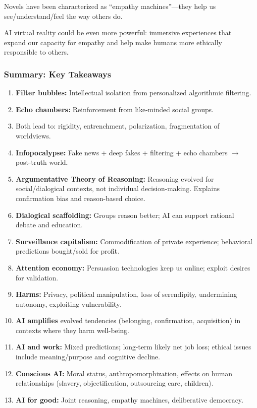 \begin{tipbox}
Novels have been characterized as ``empathy machines''---they help us see/understand/feel the way others do.

AI virtual reality could be even more powerful: immersive experiences that expand our capacity for empathy and help make humans more ethically responsible to others.
\end{tipbox}

\bigseparator

\subsubsection{Summary: Key Takeaways}

\begin{keybox}
\begin{enumerate}
  \item \textbf{Filter bubbles:} Intellectual isolation from personalized algorithmic filtering.
  \item \textbf{Echo chambers:} Reinforcement from like-minded social groups.
  \item Both lead to: rigidity, entrenchment, polarization, fragmentation of worldviews.
  \item \textbf{Infopocalypse:} Fake news + deep fakes + filtering + echo chambers $\to$ post-truth world.
  \item \textbf{Argumentative Theory of Reasoning:} Reasoning evolved for social/dialogical contexts, not individual decision-making. Explains confirmation bias and reason-based choice.
  \item \textbf{Dialogical scaffolding:} Groups reason better; AI can support rational debate and education.
  \item \textbf{Surveillance capitalism:} Commodification of private experience; behavioral predictions bought/sold for profit.
  \item \textbf{Attention economy:} Persuasion technologies keep us online; exploit desires for validation.
  \item \textbf{Harms:} Privacy, political manipulation, loss of serendipity, undermining autonomy, exploiting vulnerability.
  \item \textbf{AI amplifies} evolved tendencies (belonging, confirmation, acquisition) in contexts where they harm well-being.
  \item \textbf{AI and work:} Mixed predictions; long-term likely net job loss; ethical issues include meaning/purpose and cognitive decline.
  \item \textbf{Conscious AI:} Moral status, anthropomorphization, effects on human relationships (slavery, objectification, outsourcing care, children).
  \item \textbf{AI for good:} Joint reasoning, empathy machines, deliberative democracy.
\end{enumerate}
\end{keybox}

